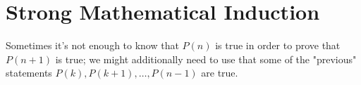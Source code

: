 \documentclass[11pt,dvipsnames]{book}
\numberwithin{figure}{section} %
\numberwithin{table}{section} %
\begin{document}

%
%
%

\section{Strong Mathematical Induction}
Sometimes it's not enough to know that $P(n)$ is true in order to prove that $P(n+1)$ is true; we might additionally need to use that some of the "previous" statements $P(k), P(k+1), \dots , P(n-1)$ are true.  \\
%
%
%
\end{document}
